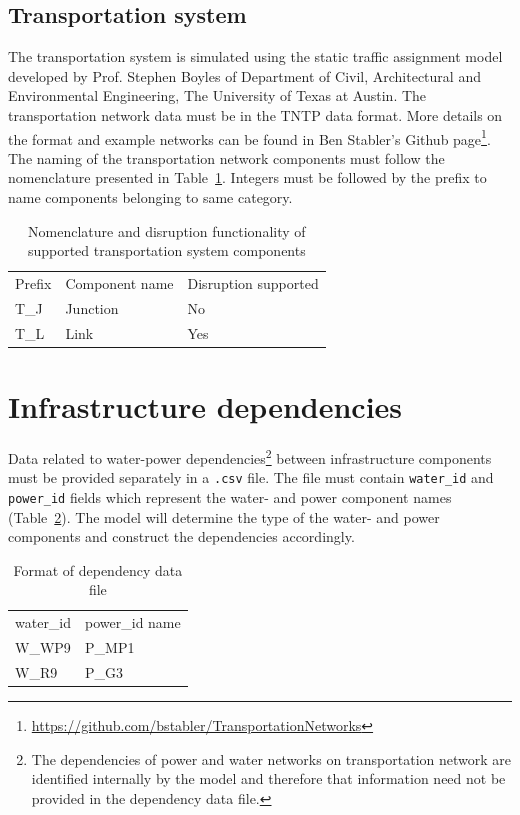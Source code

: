 \documentclass[letterpaper,12pt,english]{sphinxmanual}
\begin{document}
\subsection{Transportation system}
The transportation system is simulated using the static traffic assignment model developed by Prof. Stephen Boyles of Department of Civil, Architectural and Environmental Engineering, The University of Texas at Austin. The transportation network data must be in the TNTP data format. More details on the format and example networks can be found in Ben Stabler's Github page\footnote{\href{https://github.com/bstabler/TransportationNetworks}{https://github.com/bstabler/TransportationNetworks}}. The naming of the transportation network components must follow the nomenclature presented in Table~\ref{tab:transpo_compons}. Integers must be followed by the prefix to name components belonging to same category.

\begin{table}[h]
	\centering
	\caption{Nomenclature and disruption functionality of supported transportation system components}
	\begin{tabular}{lll}
		\rowcolor[HTML]{C0C0C0} 
		Prefix & Component name & Disruption supported \\
		T\_J   & Junction       & No                   \\
		\rowcolor[HTML]{EFEFEF} 
		T\_L   & Link           & Yes                 
	\end{tabular}
\label{tab:transpo_compons}
\end{table}

\section{Infrastructure dependencies}
Data related to water-power dependencies\footnote{The dependencies of power and water networks on transportation network are identified internally by the model and therefore that information need not be provided in the dependency data file.} between infrastructure components must be provided separately in a {\tt .csv} file. The file must contain {\tt water\_id} and {\tt power\_id} fields which represent the water- and power component names (Table~\ref{tab:interdependencies}). The model will determine the type of the water- and power components and construct the dependencies accordingly. 

\begin{table}[h]
	\centering
	\caption{Format of dependency data file}
	\begin{tabular}{ll}
		\rowcolor[HTML]{C0C0C0} 
		water\_id & power\_id name \\
		W\_WP9   & P\_MP1       \\
		\rowcolor[HTML]{EFEFEF} 
		W\_R9   & P\_G3     
	\end{tabular}
	\label{tab:interdependencies}
\end{table}
\end{document}

